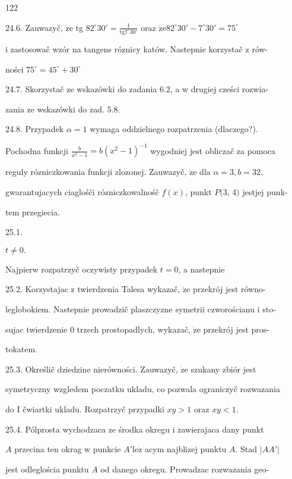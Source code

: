 \documentclass[a4paper,12pt]{article}
\begin{document}
122

24.6. Zauwazyč, $\dot{\mathrm{z}}\mathrm{e}$ tg $82^{\circ}30' = \displaystyle \frac{1}{\mathrm{t}\mathrm{g}7^{\circ}30'}$ oraz $\dot{\mathrm{z}}\mathrm{e}82^{\circ}30'-7^{\circ}30' = 75^{\circ}$

$\mathrm{i}$ zastosowač wzór na tangens róznicy katów. Nastepnie korzystač $\mathrm{z}$ rów-

ności $75^{\circ}=45^{\circ}+30^{\circ}$

24.7. Skorzystač ze wskazówki do zadania 6.2, a w drugiej cześci rozwia-

zania ze wskazówki do zad. 5.8.

24.8. Przypadek $\alpha=1$ wymaga oddzielnego rozpatrzenia (dlaczego?).

Pochodna funkcji $\displaystyle \frac{b}{x^{2}-1}=b(x^{2}-1)^{-1}$ wygodniej jest obliczač za pomoca

reguly rózniczkowania funkcji zlozonej. Zauwazyč, $\dot{\mathrm{z}}\mathrm{e}$ dla $\alpha= 3, b= 32,$

gwarantujacych ciaglośči rózniczkowalnośč $f(x)$, punkt $P(3$, 4$)$ jestjej punk-

tem przegiecia.

25.1.

$t\neq 0.$

Najpierw rozpatrzyč oczywisty przypadek $t = 0$, a nastepnie

25.2. Korzystajac $\mathrm{z}$ twierdzenia Talesa wykazač, $\dot{\mathrm{z}}\mathrm{e}$ przekrój jest równo-

leglobokiem. Nastepnie prowadzič plaszczyzne symetrii czworościanu $\mathrm{i}$ sto-

sujac twierdzenie $0$ trzech prostopadlych, wykazač, $\dot{\mathrm{z}}\mathrm{e}$ przekrój jest pros-

tokatem.

25.3. Określič dziedzine nierówności. Zauwazyč, $\dot{\mathrm{z}}\mathrm{e}$ szukany zbiór jest

symetryczny wzgledem poczatku ukladu, co pozwala ograniczyč rozwazania

do I čwiartki ukladu. Rozpatrzyč przypadki $xy>1$ oraz $xy<1.$

25.4. Pólprosta wychodzaca ze środka okregu $\mathrm{i}$ zawierajaca dany punkt

$A$ przecina ten okrag $\mathrm{w}$ punkcie $A'\mathrm{l}\mathrm{e}\dot{\mathrm{z}}$ acym najblizej punktu $A$. Stad $|AA'|$

jest odleglościa punktu $A$ od danego okregu. Prowadzac rozwazania geo-
\end{document}
